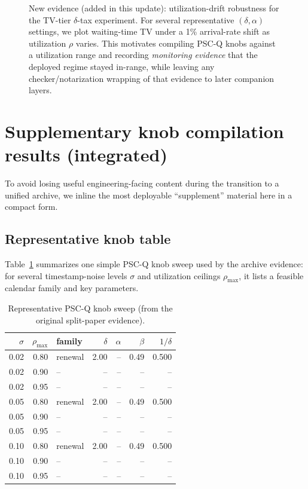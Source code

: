 \documentclass[11pt]{article}
\theoremstyle{definition}
\theoremstyle{remark}
\begin{document}
\begin{figure}[t]
\centering
{}
\caption{New evidence (added in this update): utilization-drift robustness for the TV-tier $\delta$-tax experiment.
For several representative $(\delta,\alpha)$ settings, we plot waiting-time TV under a 1\% arrival-rate shift as utilization $\rho$ varies.
This motivates compiling PSC-Q knobs against a utilization range and recording \emph{monitoring evidence} that the deployed regime stayed in-range, while leaving any checker/notarization wrapping of that evidence to later companion layers.}
\label{fig:drift}
\end{figure}



\section{Supplementary knob compilation results (integrated)}
To avoid losing useful engineering-facing content during the transition to a unified archive,
we inline the most deployable ``supplement'' material here in a compact form.

\subsection{Representative knob table}
Table~\ref{tab:pscq_knobs} summarizes one simple PSC-Q knob sweep used by the archive evidence: for several
timestamp-noise levels $\sigma$ and utilization ceilings $\rho_{\max}$, it lists a feasible calendar family and key parameters.
\begin{table}[h]
\centering
\begin{tabular}{r|r|l|r|r|r|r}
$\sigma$ & $\rho_{\max}$ & family & $\delta$ & $\alpha$ & $\beta$ & $1/\delta$ \\
\hline
0.02 & 0.80 & renewal & 2.00 & -- & 0.49 & 0.500\\
0.02 & 0.90 & -- & -- & -- & -- & --\\
0.02 & 0.95 & -- & -- & -- & -- & --\\
0.05 & 0.80 & renewal & 2.00 & -- & 0.49 & 0.500\\
0.05 & 0.90 & -- & -- & -- & -- & --\\
0.05 & 0.95 & -- & -- & -- & -- & --\\
0.10 & 0.80 & renewal & 2.00 & -- & 0.49 & 0.500\\
0.10 & 0.90 & -- & -- & -- & -- & --\\
0.10 & 0.95 & -- & -- & -- & -- & --\\
\end{tabular}
\caption{Representative PSC-Q knob sweep (from the original split-paper evidence).}\label{tab:pscq_knobs}
\end{table}
\end{document}
